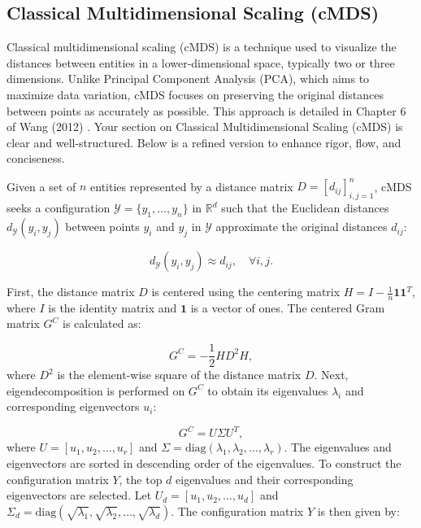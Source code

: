 \subsection{Classical Multidimensional Scaling (cMDS)}
\label{subsec:cMDS}

Classical multidimensional scaling (cMDS) is a technique used to visualize the distances between entities in a lower-dimensional space, typically two or three dimensions. Unlike Principal Component Analysis (PCA), which aims to maximize data variation, cMDS focuses on preserving the original distances between points as accurately as possible. This approach is detailed in Chapter 6 of Wang (2012) \cite{wangClassicalMultidimensionalScaling2012}.
Your section on Classical Multidimensional Scaling (cMDS) is clear and well-structured. Below is a refined version to enhance rigor, flow, and conciseness.

Given a set of \( n \) entities represented by a distance matrix \( D = [d_{ij}]_{i,j=1}^{n} \), cMDS seeks a configuration \( \mathcal{Y} = \{y_1, \ldots, y_n\} \) in \( \mathbb{R}^d \) such that the Euclidean distances \( d_{\mathcal{Y}}(y_i, y_j) \) between points \( y_i \) and \( y_j \) in \( \mathcal{Y} \) approximate the original distances \( d_{ij} \):

\begin{equation}
    d_{\mathcal{Y}} (y_i, y_j) \approx d_{ij}, \quad \forall i, j.
    \label{eq:cmds-approximation}
\end{equation}

First, the distance matrix \( D \) is centered using the centering matrix \( H = I - \frac{1}{n} \mathbf{1} \mathbf{1}^T \), where \( I \) is the identity matrix and \( \mathbf{1} \) is a vector of ones. The centered Gram matrix \( G^C \) is calculated as:

\begin{equation}
    G^C = -\frac{1}{2} H D^2 H,
    \label{eq:cmds-gram-matrix}
\end{equation}
where \( D^2 \) is the element-wise square of the distance matrix \( D \). Next, eigendecomposition is performed on \( G^C \) to obtain its eigenvalues \( \lambda_i \) and corresponding eigenvectors \( u_i \):

\begin{equation}
    G^C = U \Sigma U^T,
    \label{eq:cmds-eigen-decomposition}
\end{equation}
where \( U = [u_1, u_2, \ldots, u_r] \) and \( \Sigma = \text{diag}(\lambda_1, \lambda_2, \ldots, \lambda_r) \). The eigenvalues and eigenvectors are sorted in descending order of the eigenvalues. To construct the configuration matrix \( Y \), the top \( d \) eigenvalues and their corresponding eigenvectors are selected. Let \( U_d = [u_1, u_2, \ldots, u_d] \) and \( \Sigma_d = \text{diag}(\sqrt{\lambda_1}, \sqrt{\lambda_2}, \ldots, \sqrt{\lambda_d}) \). The configuration matrix \( Y \) is then given by:

